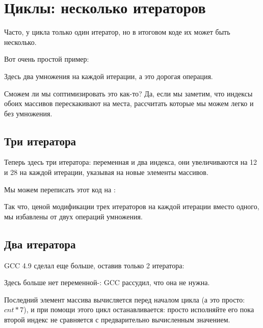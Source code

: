 ﻿\section{Циклы: несколько итераторов}
\label{loop_iterators}

Часто, у цикла только один итератор, но в итоговом коде их может быть несколько.

Вот очень простой пример:



Здесь два умножения на каждой итерации, а это дорогая операция.

Сможем ли мы соптимизировать это как-то?
Да, если мы заметим, что индексы обоих массивов перескакивают на места, рассчитать которые мы
можем легко и без умножения.

\subsection{Три итератора}



Теперь здесь три итератора: переменная  и два индекса, они увеличиваются на 12 и 28 на каждой
итерации, указывая на новые элементы массивов.

Мы можем переписать этот код на \CCpp:



Так что, ценой модификации трех итераторов на каждой итерации вместо одного, 
мы избавлены от двух операций умножения.

\subsection{Два итератора}

GCC 4.9 сделал еще больше, оставив только 2 итератора:



Здесь больше нет переменной-: GCC рассудил, что она не нужна.

Последний элемент массива  вычисляется перед началом цикла (а это просто: $cnt*7$),
и при помощи этого цикл останавливается: просто исполняйте его пока второй индекс не сравняется
с предварительно вычисленным значением.

